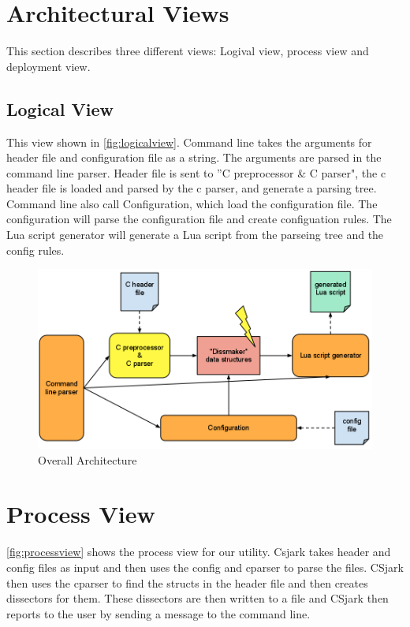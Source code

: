 \section{Architectural Views}
This section describes three different views: Logival view, process view and deployment view.

\subsection{Logical View}
This view shown in \autoref{fig:logicalview}. Command line takes the arguments for header file and configuration file as a string. The arguments are parsed in the command line parser. Header file is sent to ''C preprocessor \& C parser", the c header file is loaded and parsed by the c parser, and generate a parsing tree. Command line also call Configuration, which load the configuration file. The configuration will parse the configuration file and create configuation rules. The Lua script generator will generate a Lua script from the parseing tree and the config rules.

\begin{figure}[htb]
	\includegraphics[width=\textwidth]{./planning/img/overall_design}
	\caption{Overall Architecture\label{fig:logicalview}}
\end{figure}


\section{Process View}
\autoref{fig:processview} shows the process view for our utility. Csjark takes header and config files as input and then uses the config and cparser to parse the files. CSjark then uses the cparser to find the structs in the header file and then creates dissectors for them. These dissectors are then written to a file and CSjark then reports to the user by sending a message to the command line.

